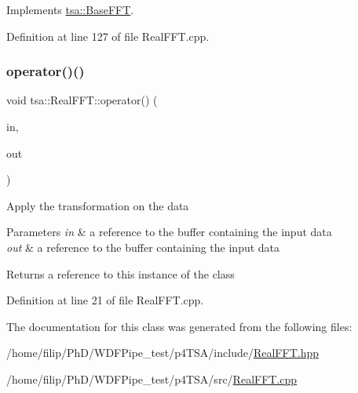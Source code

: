 Implements \hyperlink{classtsa_1_1_base_f_f_t_a9af0c36413173821cac8dbdce9cfe3b4}{tsa\+::\+Base\+F\+FT}.



Definition at line 127 of file Real\+F\+F\+T.\+cpp.

\mbox{\label{classtsa_1_1_real_f_f_t_a3bf380302985631f972017262e83be11}} 
\subsubsection{\texorpdfstring{operator()()}{operator()()}}
{\footnotesize\ttfamily void tsa\+::\+Real\+F\+F\+T\+::operator() (\begin{DoxyParamCaption}\item[{\hyperlink{namespacetsa_ac599574bcc094eda25613724b8f3ca9e}{Seq\+View\+Double} \&}]{in,  }\item[{\hyperlink{namespacetsa_ab32775c889b53c40fa83939f22372b75}{Seq\+View\+Complex} \&}]{out }\end{DoxyParamCaption})}

Apply the transformation on the data


\begin{DoxyParams}{Parameters}
{\em in} & a reference to the buffer containing the input data \\
\hline
{\em out} & a reference to the buffer containing the input data\\
\hline
\end{DoxyParams}
\begin{DoxyReturn}{Returns}
a reference to this instance of the class 
\end{DoxyReturn}


Definition at line 21 of file Real\+F\+F\+T.\+cpp.



The documentation for this class was generated from the following files\+:\begin{DoxyCompactItemize}
\item 
/home/filip/\+Ph\+D/\+W\+D\+F\+Pipe\+\_\+test/p4\+T\+S\+A/include/\hyperlink{_real_f_f_t_8hpp}{Real\+F\+F\+T.\+hpp}\item 
/home/filip/\+Ph\+D/\+W\+D\+F\+Pipe\+\_\+test/p4\+T\+S\+A/src/\hyperlink{_real_f_f_t_8cpp}{Real\+F\+F\+T.\+cpp}\end{DoxyCompactItemize}
